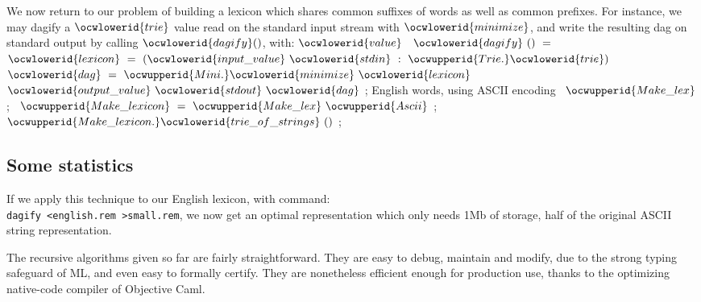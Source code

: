 \documentclass[12pt]{article}
\begin{document}
We now return to our problem of building a lexicon which shares
common suffixes of words as well as common prefixes.
\label{../ML/dagify.ml:0}%
For instance, we may dagify a \ocwbegindcode{}$\ocwlowerid{trie}$\ocwenddcode{} value read on the standard input
stream with \ocwbegindcode{}$\ocwlowerid{minimize}$\ocwenddcode{}, and write the resulting dag on standard output
by calling \ocwbegindcode{}$\ocwlowerid{dagify}()$\ocwenddcode{}, with: 
\ocweol
\label{../ML/dagify.ml:871}%
\medskip
\ocwbegincode{}\ocwindent{0.00em}
$\ocwlowerid{value}~$~$\ocwlowerid{dagify}~()~=$\ocweol
\ocwindent{1.00em}
~$\ocwlowerid{lexicon}~=~(\ocwlowerid{input\_value}~\ocwlowerid{stdin}~:~\ocwupperid{Trie.}\ocwlowerid{trie})~$\ocweol
\ocwindent{1.00em}
~$\ocwlowerid{dag}~=~\ocwupperid{Mini.}\ocwlowerid{minimize}~\ocwlowerid{lexicon}~$\ocweol
\ocwindent{1.00em}
$\ocwlowerid{output\_value}~\ocwlowerid{stdout}~\ocwlowerid{dag}$\ocweol
\ocwindent{0.00em}
;\ocweol
\ocwendcode{}
\label{../ML/make_english_lexicon.ml:0}%
English words, using ASCII encoding 
\ocweol
\label{../ML/make_english_lexicon.ml:757}%
\medskip
\ocwbegincode{}\ocwindent{0.00em}
~$\ocwupperid{Make\_lex}$\ocweol
\ocwindent{0.00em}
;\ocweol
\ocwindent{0.00em}
~$\ocwupperid{Make\_lexicon}~=~\ocwupperid{Make\_lex}~\ocwupperid{Ascii}$\ocweol
\ocwindent{0.00em}
;\ocweol
\ocwindent{0.00em}
$\ocwupperid{Make\_lexicon.}\ocwlowerid{trie\_of\_strings}~()$\ocweol
\ocwindent{0.00em}
;\ocweol
\ocweol
\ocwendcode{}\subsection{Some statistics}

\vspace*{15pt}

If we apply this technique to our English lexicon, with command:\\
\verb:dagify <english.rem >small.rem:, we now get an optimal
representation which only needs 1Mb of storage, half of the
original ASCII string representation.

The recursive algorithms given so far are fairly straightforward. 
They are easy to debug, maintain and modify,
due to the strong typing safeguard of ML, and even easy to formally certify. 
They are nonetheless efficient enough for production use, thanks to the
optimizing native-code compiler of Objective Caml. 
\end{document}
